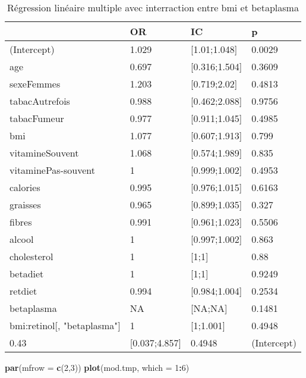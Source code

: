 \documentclass[]{article}
\newenvironment{Shaded}{\begin{snugshade}}{\end{snugshade}}
\newcommand{\KeywordTok}[1]{\textcolor[rgb]{0.13,0.29,0.53}{\textbf{#1}}}
\newcommand{\DataTypeTok}[1]{\textcolor[rgb]{0.13,0.29,0.53}{#1}}
\newcommand{\DecValTok}[1]{\textcolor[rgb]{0.00,0.00,0.81}{#1}}
\newcommand{\OperatorTok}[1]{\textcolor[rgb]{0.81,0.36,0.00}{\textbf{#1}}}
\newcommand{\NormalTok}[1]{#1}
\begin{document}
\begin{table}

\caption{\label{tab:unnamed-chunk-86}Régression linéaire multiple avec interraction entre bmi et betaplasma}
\centering
\begin{tabular}[t]{l|l|l|l}
\hline
  & OR & IC & p\\
\hline
\rowcolor[HTML]{BBD2E1}  (Intercept) & 1.029 & [1.01;1.048] & 0.0029\\
\hline
age & 0.697 & [0.316;1.504] & 0.3609\\
\hline
\rowcolor[HTML]{BBD2E1}  sexeFemmes & 1.203 & [0.719;2.02] & 0.4813\\
\hline
tabacAutrefois & 0.988 & [0.462;2.088] & 0.9756\\
\hline
\rowcolor[HTML]{BBD2E1}  tabacFumeur & 0.977 & [0.911;1.045] & 0.4985\\
\hline
bmi & 1.077 & [0.607;1.913] & 0.799\\
\hline
\rowcolor[HTML]{BBD2E1}  vitamineSouvent & 1.068 & [0.574;1.989] & 0.835\\
\hline
vitaminePas-souvent & 1 & [0.999;1.002] & 0.4953\\
\hline
\rowcolor[HTML]{BBD2E1}  calories & 0.995 & [0.976;1.015] & 0.6163\\
\hline
graisses & 0.965 & [0.899;1.035] & 0.327\\
\hline
\rowcolor[HTML]{BBD2E1}  fibres & 0.991 & [0.961;1.023] & 0.5506\\
\hline
alcool & 1 & [0.997;1.002] & 0.863\\
\hline
\rowcolor[HTML]{BBD2E1}  cholesterol & 1 & [1;1] & 0.88\\
\hline
betadiet & 1 & [1;1] & 0.9249\\
\hline
\rowcolor[HTML]{BBD2E1}  retdiet & 0.994 & [0.984;1.004] & 0.2534\\
\hline
betaplasma & NA & [NA;NA] & 0.1481\\
\hline
\rowcolor[HTML]{BBD2E1}  bmi:retinol[, "betaplasma"] & 1 & [1;1.001] & 0.4948\\
\hline
0.43 & [0.037;4.857] & 0.4948 & (Intercept)\\
\hline
\end{tabular}
\end{table}

\begin{Shaded}
\begin{Highlighting}[]
\KeywordTok{par}\NormalTok{(}\DataTypeTok{mfrow =} \KeywordTok{c}\NormalTok{(}\DecValTok{2}\NormalTok{,}\DecValTok{3}\NormalTok{))}
\KeywordTok{plot}\NormalTok{(mod.tmp, }\DataTypeTok{which =} \DecValTok{1}\OperatorTok{:}\DecValTok{6}\NormalTok{)}
\end{Highlighting}
\end{Shaded}
\end{document}
